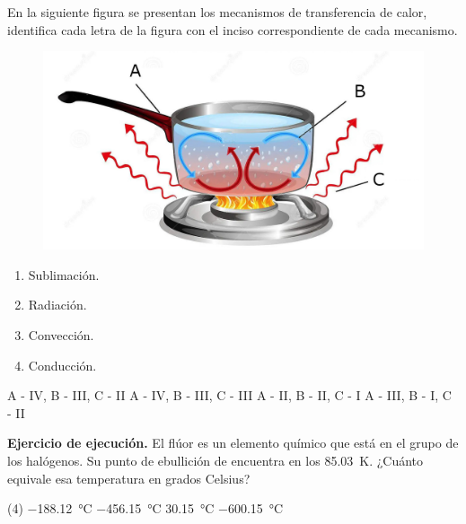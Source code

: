 \documentclass[12pt, letter]{exam}
\begin{document}
\begin{questions}

    \newpage

    \question En la siguiente figura se presentan los mecanismos de transferencia de calor, identifica cada letra de la figura con el inciso correspondiente de cada mecanismo.
    \begin{figure}[H]
        \centering
        \includegraphics[scale=0.2]{Transferencia_Calor_01.jpg}
    \end{figure}
    \begin{multicols}{4}
    \begin{enumerate}[label=\Roman*)]
        \item Sublimación.
        \item Radiación.
        \item Convección.
        \item Conducción.
    \end{enumerate}
    \end{multicols}
    \begin{tasks}
        \task A - IV, B - III, C - II
        \task A - IV, B - III, C - III
        \task A - II, B - II, C - I
        \task A - III, B - I, C - II
    \end{tasks}
    \question\label{Ejercicio_11} \textbf{Ejercicio de ejecución. } El flúor es un elemento químico que está en el grupo de los halógenos. Su punto de ebullición de encuentra en los \SI{85.03}{\kelvin}. ¿Cuánto equivale esa temperatura en grados Celsius?
    \begin{tasks}(4)
        \task \SI{-188.12}{\degreeCelsius}
        \task \SI{-456.15}{\degreeCelsius}
        \task \SI{30.15}{\degreeCelsius}
        \task \SI{-600.15}{\degreeCelsius}
    \end{tasks}


\end{questions}
\end{document}
